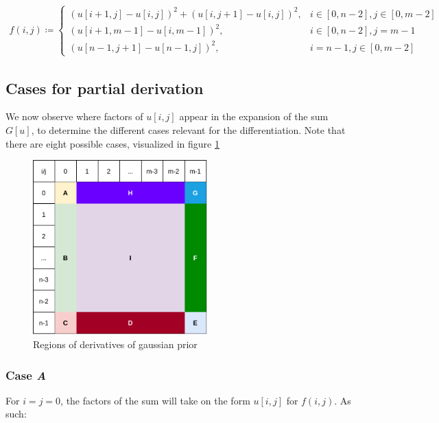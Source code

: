 \documentclass[a4paper]{scrreprt}
\begin{document}
\begin{align*}
		f(i, j) \coloneqq 
		\begin{cases}
				(u[i + 1, j] - u[i, j])^2 + (u[i, j + 1] - u[i, j])^2, & i \in [0, n - 2], j \in [0, m - 2] \\
				(u[i + 1, m - 1] - u[i, m - 1])^2, & i \in [0, n - 2], j = m - 1 \\
				(u[n - 1, j + 1] - u[n - 1, j])^2, & i = n - 1, j \in [0, m - 2]
		\end{cases}
\end{align*}

\subsection{Cases for partial derivation}

We now observe where factors of $u[i, j]$ appear in the expansion of the sum
$G[u]$, to determine the different cases relevant for the differentiation. Note
that there are eight possible cases, visualized in figure
\ref{fig:gaussian_prior_derivatives}

\begin{figure}
		\centering
		\includegraphics[width=0.6\textwidth]{resources/gaussian_prior_derivatives.drawio.png}
		\caption{Regions of derivatives of gaussian prior}
		\label{fig:gaussian_prior_derivatives}
\end{figure}


\subsubsection{Case \emph{A}}

For $i = j = 0$, the factors of the sum will take on the form $u[i, j]$ for
$f(i, j)$. As such:
\end{document}
